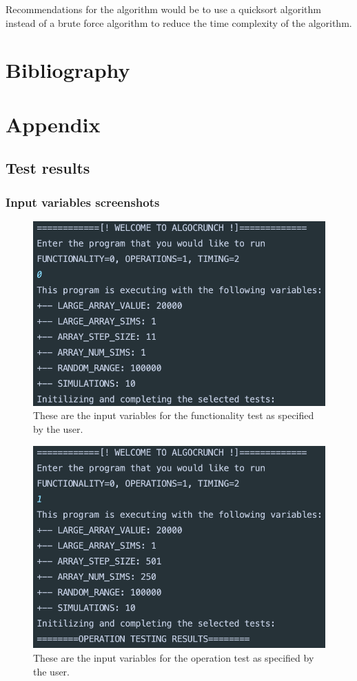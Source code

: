 \documentclass[12pt]{article}
\begin{document}
Recommendations for the algorithm would be to use a quicksort algorithm instead of a brute force algorithm to reduce the time complexity of the algorithm.  

\section{Bibliography}
 


\section{Appendix}
\subsection{Test results}
\subsubsection{Input variables screenshots}
\begin{figure}[H]
	\centering
	\includegraphics[width=0.7\linewidth]{"Results/Screenshots/Functionality Test/FunctionalityTestWelcome"}
	\caption[]{These are the input variables for the functionality test as specified by the user.}
	\label{fig:functionalitytestwelcome}
\end{figure}

\begin{figure}[H]
	\centering
	\includegraphics[width=0.7\linewidth]{"Results/Screenshots/Operational Test/OperationalTestVariables"}
	\caption{These are the input variables for the operation test as specified by the user.}
	\label{fig:operationaltestvariables}
\end{figure}
\end{document}

